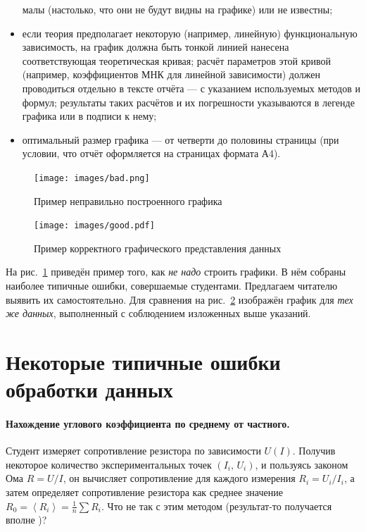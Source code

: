 \begin{itemize}
малы (настолько, что они не будут видны на графике) или не известны;
    \item если теория предполагает некоторую (например, линейную) функциональную
зависимость, на график должна быть тонкой линией нанесена соответствующая
теоретическая кривая; расчёт параметров этой кривой (например, коэффициентов
МНК для линейной зависимости) должен проводиться отдельно в тексте
отчёта --- с указанием используемых методов и формул; результаты
таких расчётов и их погрешности указываются в легенде графика или
в подписи к нему;
    \item оптимальный размер графика --- от четверти до половины страницы
(при условии, что отчёт оформляется на страницах формата А4).
\end{itemize}

\begin{figure}[h!]
    \begin{centering}
        \texttt{[image: images/bad.png]}
        \par\end{centering}
    \caption{\label{fig:incorrect}Пример неправильно построенного графика}
\end{figure}
\begin{figure}[h!]
    \begin{centering}
        \texttt{[image: images/good.pdf]}
        \par\end{centering}
    \caption{\label{fig:correct}Пример корректного графического представления
        данных}
\end{figure}

На рис.~\ref{fig:incorrect} приведён пример того, как \emph{не надо}
строить графики. В нём собраны наиболее типичные ошибки, совершаемые
студентами. Предлагаем читателю выявить их самостоятельно. Для сравнения
на рис.~\ref{fig:correct} изображён график для \emph{тех же данных},
выполненный с соблюдением изложенных выше указаний.


\section{Некоторые типичные ошибки обработки данных}

\paragraph{Нахождение углового коэффициента по среднему от частного.}
Студент измеряет сопротивление резистора по зависимости $U\!\left(I\right)$.
Получив некоторое количество экспериментальных точек
$\left(I_{i},\,U_{i}\right)$,
и пользуясь законом Ома $R=U/I$, он вычисляет сопротивление для каждого
измерения $R_{i}=U_{i}/I_{i}$, а затем определяет сопротивление резистора
как среднее значение $R_{0}=\left\langle R_{i}\right\rangle =\frac{1}{n}\sum
R_{i}$.
Что не так с этим методом (результат-то получается вполне )?


